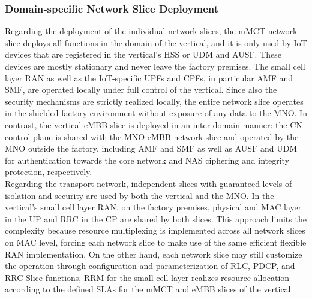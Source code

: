 \documentclass{report}
\begin{document}
\subsubsection{Domain‐specific Network Slice Deployment}
Regarding the deployment of the individual network slices, the mMCT network slice deploys all functions in the domain of the vertical, and it is only used by IoT
devices that are registered in the vertical’s \gls{HSS} or \gls{UDM} and \gls{AUSF}. These devices are mostly stationary and never
leave the factory premises. The small cell layer RAN as well as the IoT‐specific \gls{UPF}s and \gls{CPF}s, in particular \gls{AMF} and \gls{SMF}, are operated locally under full control of
the vertical. Since also the security mechanisms are strictly realized locally, the entire network slice operates in the shielded factory environment without exposure of any data to the MNO. In contrast, the vertical eMBB slice is deployed
in an inter‐domain manner: the CN control plane is shared with the MNO
eMBB network slice and operated by the MNO outside the factory, including AMF and SMF as well
as AUSF and \gls{UDM} for authentication towards the core network and \gls{NAS}
ciphering and integrity protection, respectively. \\
Regarding the transport network, independent slices
with guaranteed levels of isolation and security are used by both the vertical and the MNO. In the vertical’s small cell layer RAN, on the factory premises, physical and MAC layer in the UP
and \gls{RRC} in the CP are shared by both slices. This approach limits the complexity because resource
multiplexing is implemented across all network slices on MAC level, forcing each network slice to
make use of the same efficient flexible RAN implementation. On the other hand, each network slice
may still customize the operation through configuration and parameterization of \gls{RLC}, \gls{PDCP}, and RRC‐Slice functions, RRM for the small cell layer realizes resource allocation
according to the defined SLAs for the mMCT and eMBB slices of the vertical.
\end{document}
